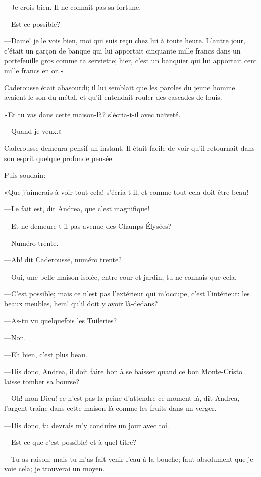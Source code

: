 —Je crois bien. Il ne connaît pas sa fortune. 

—Est-ce possible? 

—Dame! je le vois bien, moi qui suis reçu chez lui à toute heure. L'autre jour, c'était un garçon de banque qui lui apportait cinquante mille francs dans un portefeuille gros comme ta serviette; hier, c'est un banquier qui lui apportait cent mille francs en or.» 

Caderousse était abasourdi; il lui semblait que les paroles du jeune homme avaient le son du métal, et qu'il entendait rouler des cascades de louis. 

«Et tu vas dans cette maison-là? s'écria-t-il avec naïveté. 

—Quand je veux.» 

Caderousse demeura pensif un instant. Il était facile de voir qu'il retournait dans son esprit quelque profonde pensée. 

Puis soudain: 

«Que j'aimerais à voir tout cela! s'écria-t-il, et comme tout cela doit être beau! 

—Le fait est, dit Andrea, que c'est magnifique! 

—Et ne demeure-t-il pas avenue des Champs-Élysées? 

—Numéro trente. 

—Ah! dit Caderousse, numéro trente? 

—Oui, une belle maison isolée, entre cour et jardin, tu ne connais que cela. 

—C'est possible; mais ce n'est pas l'extérieur qui m'occupe, c'est l'intérieur: les beaux meubles, hein! qu'il doit y avoir là-dedans? 

—As-tu vu quelquefois les Tuileries? 

—Non. 

—Eh bien, c'est plus beau. 

—Dis donc, Andrea, il doit faire bon à se baisser quand ce bon Monte-Cristo laisse tomber sa bourse? 

—Oh! mon Dieu! ce n'est pas la peine d'attendre ce moment-là, dit Andrea, l'argent traîne dans cette maison-là comme les fruits dans un verger. 

—Dis donc, tu devrais m'y conduire un jour avec toi. 

—Est-ce que c'est possible! et à quel titre? 

—Tu as raison; mais tu m'as fait venir l'eau à la bouche; faut absolument que je voie cela; je trouverai un moyen. 

